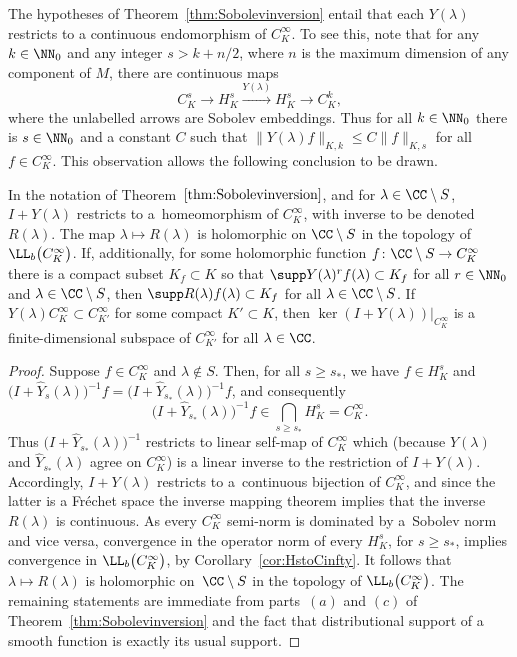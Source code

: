  The hypotheses of Theorem~\ref{thm:Sobolevinversion} entail that each $Y(\lambda)$ restricts to a continuous endomorphism of $C^\infty_K$. To see this, note that for any $k\in\NN_0$ and any integer $s>k+n/2$, where $n$ is the maximum dimension of any component of $M$, there are continuous maps
 \begin{equation*}
 	C^s_K \longrightarrow H^s_K \stackrel{Y(\lambda)}{\longrightarrow} H^s_K \longrightarrow C^k_K,
 \end{equation*}
 where the unlabelled arrows are Sobolev embeddings. Thus for all $k\in \NN_0$ there is $s\in \NN_0$ and a constant $C$ such that
 $\|Y(\lambda)f\|_{K,k}\le C \|f\|_{K,s}$ for all $f\in C^\infty_K$. This observation allows the following conclusion to be drawn.
 \begin{Corollary}\label{cor:CKinfty_inversion}
 	In the notation of Theorem~$\ref{thm:Sobolevinversion}$, and for $\lambda\in\CC\setminus S$, $I+ Y(\lambda)$ restricts to a~homeomorphism of $C^\infty_K$, with inverse to be denoted $R(\lambda)$. The map $\lambda\mapsto R(\lambda)$ is
 	holomorphic on $\CC\setminus S$ in the topology of $\LL_b\big(C^\infty_K\big)$.
 	If, additionally, for some holomorphic function $f\colon \CC\setminus S\to C^\infty_K$
 	there is a compact subset $K_f\subset K$ so that $\supp Y(\lambda)^r f(\lambda)\subset K_f$ for all $r\in\NN_0$ and $\lambda\in \CC\setminus S$, then $\supp R(\lambda) f(\lambda)\subset K_f$ for all $\lambda\in \CC\setminus S$. If $Y(\lambda)C^\infty_K\subset C^\infty_{K'}$ for some compact $K'\subset K$, then
 	$\ker(I+ Y(\lambda))|_{C^\infty_K}$ is a finite-dimensional subspace of $C^\infty_{K'}$
 	for all $\lambda\in\CC$.
 \end{Corollary}
 \begin{proof}
 	Suppose $f\in C^\infty_K$ and $\lambda\notin S$. Then, for all $s\ge s_*$,
 	we have	$f\in H^s_K$ and $\big(I+ \hat{Y}_{s}(\lambda)\big)^{-1}f=\big(I+\hat{Y}_{s_*}(\lambda)\big)^{-1}f$, and consequently
 	\begin{equation*}
 		\big(I+\hat{Y}_{s_*}(\lambda)\big)^{-1}f\in \bigcap_{s\ge s_*} H^s_K = C^\infty_K.
 	\end{equation*}
 	Thus $\big(I+\hat{Y}_{s_*}(\lambda)\big)^{-1}$ restricts to linear self-map of $C^\infty_K$ which
 	\big(because $Y(\lambda)$ and $\hat{Y}_{s_*}(\lambda)$ agree on $C^\infty_K$\big) is a linear inverse to the restriction of $I+ Y(\lambda)$. Accordingly, $I+ Y(\lambda)$ restricts to a~continuous bijection of $C^\infty_K$, and since the latter is a Fr\'echet space the inverse mapping theorem implies that the inverse $R(\lambda)$ is continuous.
 	As every $C^\infty_K$ semi-norm is dominated by a~Sobolev norm and
 	vice versa, convergence in the operator norm of every $H^s_K$, for $s\ge s_*$,
 	implies convergence in $\LL_b\big(C^\infty_K\big)$, by Corollary~\ref{cor:HstoCinfty}. It follows that $\lambda\mapsto R(\lambda)$ is holomorphic on~$\CC\setminus S$ in the topology of $\LL_b\big(C^\infty_K\big)$.
 	The remaining statements are immediate from parts~$(a)$ and $(c)$ of Theorem~\ref{thm:Sobolevinversion} and the fact that distributional support of a smooth function is exactly its usual support.
 \end{proof}


